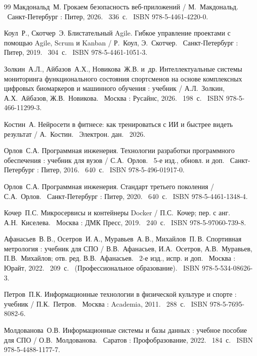 \begin{thebibliography}{99}
	Макдональд~М. Грокаем безопасность веб-приложений / М.~Макдональд. \textemdash\ Санкт-Петербург : Питер, 2026. \textemdash\ 336~с. \textemdash\ ISBN 978-5-4461-4220-0.

	Коул~Р., Скотчер~Э. Блистательный Agile. Гибкое управление проектами с помощью Agile, Scrum и Kanban / Р.~Коул, Э.~Скотчер. \textemdash\ Санкт-Петербург : Питер, 2019. \textemdash\ 304~с. \textemdash\ ISBN 978-5-4461-1051-3.

	Золкин~А.Л., Айбазов~А.Х., Новикова~Ж.В. и~др. Интеллектуальные системы мониторинга функционального состояния спортсменов на основе комплексных цифровых биомаркеров и машинного обучения : учебник / А.Л.~Золкин, А.Х.~Айбазов, Ж.В.~Новикова. \textemdash\ Москва : Русайнс, 2026. \textemdash\ 198~с. \textemdash\ ISBN 978-5-466-11299-3.

	Костин~А. Нейросети в фитнесе: как тренироваться с ИИ и быстрее видеть результат / А.~Костин. \textemdash\ Электрон. дан. \textemdash\ 2026.

	Орлов~С.А. Программная инженерия. Технологии разработки программного обеспечения : учебник для вузов / С.А.~Орлов. \textemdash\ 5-е изд., обновл. и доп. \textemdash\ Санкт-Петербург : Питер, 2016. \textemdash\ 640~с. \textemdash\ ISBN 978-5-496-01917-0.

	Орлов~С.А. Программная инженерия. Стандарт третьего поколения / С.А.~Орлов. \textemdash\ Санкт-Петербург : Питер, 2020. \textemdash\ 640~с. \textemdash\ ISBN 978-5-4461-1348-4.

	Кочер~П.С. Микросервисы и контейнеры Docker / П.С.~Кочер; пер. с анг. А.Н.~Киселева. \textemdash\ Москва : ДМК Пресс, 2019. \textemdash\ 240~с. \textemdash\ ISBN 978-5-97060-739-8.

	Афанасьев~В.\,В., Осетров~И.\,А., Муравьев~А.\,В., Михайлов~П.\,В. Спортивная метрология : учебник для СПО / В.В.~Афанасьев, И.А.~Осетров, А.В.~Муравьев, П.В.~Михайлов; отв. ред. В.В.~Афанасьев. \textemdash\ 2-е изд., испр. и доп. \textemdash\ Москва : Юрайт, 2022. \textemdash\ 209~с. \textemdash\ (Профессиональное образование). \textemdash\ ISBN 978-5-534-08626-3.

	Петров~П.К. Информационные технологии в физической культуре и спорте : учебник / П.К.~Петров. \textemdash\ Москва : Academia, 2011. \textemdash\ 288~с. \textemdash\ ISBN 978-5-7695-8082-6.

	Молдованова~О.В. Информационные системы и базы данных : учебное пособие для СПО / О.В.~Молдованова. \textemdash\ Саратов : Профобразование, 2022. \textemdash\ 184~с. \textemdash\ ISBN 978-5-4488-1177-7.


\end{thebibliography}
